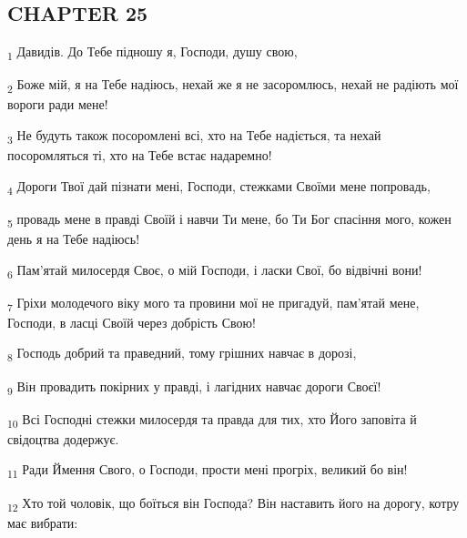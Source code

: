 \subsection{CHAPTER 25}
\begin{tcolorbox}
\textsubscript{1} Давидів. До Тебе підношу я, Господи, душу свою,
\end{tcolorbox}
\begin{tcolorbox}
\textsubscript{2} Боже мій, я на Тебе надіюсь, нехай же я не засоромлюсь, нехай не радіють мої вороги ради мене!
\end{tcolorbox}
\begin{tcolorbox}
\textsubscript{3} Не будуть також посоромлені всі, хто на Тебе надіється, та нехай посоромляться ті, хто на Тебе встає надаремно!
\end{tcolorbox}
\begin{tcolorbox}
\textsubscript{4} Дороги Твої дай пізнати мені, Господи, стежками Своїми мене попровадь,
\end{tcolorbox}
\begin{tcolorbox}
\textsubscript{5} провадь мене в правді Своїй і навчи Ти мене, бо Ти Бог спасіння мого, кожен день я на Тебе надіюсь!
\end{tcolorbox}
\begin{tcolorbox}
\textsubscript{6} Пам'ятай милосердя Своє, о мій Господи, і ласки Свої, бо відвічні вони!
\end{tcolorbox}
\begin{tcolorbox}
\textsubscript{7} Гріхи молодечого віку мого та провини мої не пригадуй, пам'ятай мене, Господи, в ласці Своїй через добрість Свою!
\end{tcolorbox}
\begin{tcolorbox}
\textsubscript{8} Господь добрий та праведний, тому грішних навчає в дорозі,
\end{tcolorbox}
\begin{tcolorbox}
\textsubscript{9} Він провадить покірних у правді, і лагідних навчає дороги Своєї!
\end{tcolorbox}
\begin{tcolorbox}
\textsubscript{10} Всі Господні стежки милосердя та правда для тих, хто Його заповіта й свідоцтва додержує.
\end{tcolorbox}
\begin{tcolorbox}
\textsubscript{11} Ради Ймення Свого, о Господи, прости мені прогріх, великий бо він!
\end{tcolorbox}
\begin{tcolorbox}
\textsubscript{12} Хто той чоловік, що боїться він Господа? Він наставить його на дорогу, котру має вибрати:
\end{tcolorbox}
